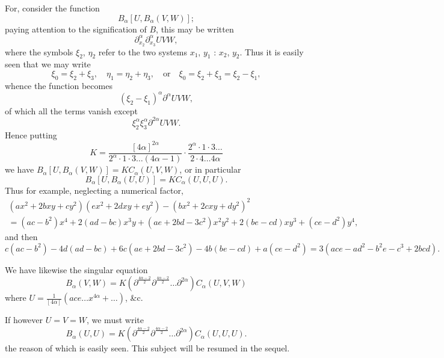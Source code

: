 \documentclass[11pt,a4paper]{book}
\begin{document}
For, consider the function
\[
B_{\alpha}[U, B_{\alpha}(V, W)];
\]
paying attention to the signification of $B$, this may be written
\[
\partial_{x_2}^{\alpha} \partial_{x_3}^{\alpha} UVW,
\]
where the symbols $\xi_2$, $\eta_2$ refer to the two systems $x_1$, $y_1$ : $x_2$, $y_2$. Thus it is easily seen
that we may write
\[
\xi_0 = \xi_2 + \xi_3, \quad \eta_1 = \eta_2 + \eta_3, \quad \text{or} \quad \xi_0 = \xi_2 + \xi_3 = \xi_2 - \xi_1,
\]
whence the function becomes
\[
(\xi_2 - \xi_1)^{\alpha} \partial^{\alpha} UVW,
\]
of which all the terms vanish except
\[
\xi_2^{\alpha} \xi_3^{\alpha} \partial^{2\alpha} UVW.
\]
Hence putting
\[
K = \frac{[4\alpha]^{2\alpha}}{2^{\alpha} \cdot 1 \cdot 3 \ldots (4\alpha - 1)} \cdot
\frac{2^{\alpha} \cdot 1 \cdot 3 \ldots}{2 \cdot 4 \ldots 4\alpha}
\]
we have $B_{\alpha}[U, B_{\alpha}(V, W)] = K C_{\alpha}(U, V, W)$,
or in particular
\[
B_{\alpha}[U, B_{\alpha}(U, U)] = K C_{\alpha}(U, U, U).
\]
Thus for example, neglecting a numerical factor,
\begin{align*}
(ax^2 + 2bxy + cy^2)(ex^2 + 2dxy + ey^2) - (bx^2 + 2cxy + dy^2)^2 \\
= (ac - b^2)x^4 + 2(ad - bc)x^3y + (ae + 2bd - 3c^2)x^2y^2 + 2(be - cd)xy^3 + (ce - d^2)y^4,
\end{align*}
and then
\[
c(ac - b^2) - 4d(ad - bc) + 6c(ae + 2bd - 3c^2) - 4b(be - cd) + a(ce - d^2)
= 3(ace - ad^2 - b^2e - c^3 + 2bcd).
\]

We have likewise the singular equation
\[
B_{\alpha}(V, W) = K(\partial^{\frac{4\alpha - 2}{2}} \partial^{\frac{4\alpha - 2}{2}} \ldots \partial^{2\alpha}) C_{\alpha}(U, V, W)
\]
where $U = \frac{1}{[4\alpha]} (ace \ldots x^{4\alpha} + \ldots)$, \&c.

If however $U = V = W$, we must write
\[
B_{\alpha}(U, U) = K(\partial^{\frac{4\alpha - 2}{2}} \partial^{\frac{4\alpha - 2}{2}} \ldots \partial^{2\alpha}) C_{\alpha}(U, U, U).
\]
the reason of which is easily seen. This subject will be resumed in the sequel.
\end{document}
